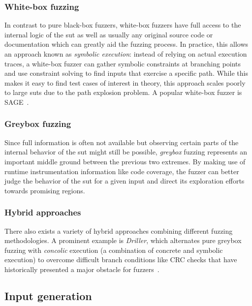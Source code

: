 \subsubsection{White-box fuzzing}

In contrast to pure black-box fuzzers, white-box fuzzers have full access to
the internal logic of the \gls{sut} as well as usually any original source code or
documentation which can greatly aid the fuzzing process.
In practice, this allows an approach known as \emph{symbolic execution}: instead
of relying on actual execution traces, a white-box fuzzer can gather symbolic
constraints at branching points and use constraint solving to find inputs that exercise
a specific path.
While this makes it easy to find test cases of interest in theory, this approach scales poorly
to large \glspl{sut} due to the path explosion problem.
A popular white-box fuzzer is SAGE~\cite{godefroid_sage_2012}.

\subsubsection{Greybox fuzzing}

Since full information is often not available but observing certain parts
of the internal behavior of the \gls{sut} might still be possible, \textit{greybox}
fuzzing represents an important middle ground between the previous two extremes.
By making use of runtime instrumentation information like code coverage, the fuzzer can
better judge the behavior of the \gls{sut} for a given input and direct its exploration efforts towards promising regions.

\subsubsection{Hybrid approaches}

There also exists a variety of hybrid approaches combining different fuzzing methodologies.
A prominent example is \emph{Driller}, which alternates pure greybox fuzzing with
\emph{concolic} execution (a combination of concrete and symbolic execution) to overcome difficult branch
conditions like CRC checks that have historically presented a major obstacle for fuzzers~\cite{stephens_driller_2016}.

\subsection{Input generation}\label{sec:fuzzing-input-generation}


